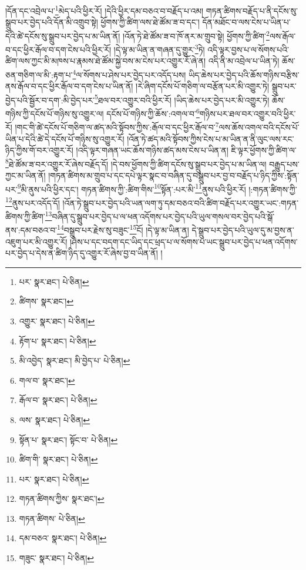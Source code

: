 །དོན་དང་འབྲེལ་པ་\footnote{པར་  སྣར་ཐང་།  པེ་ཅིན། }མེད་པའི་ཕྱིར་རོ། །དེའི་ཕྱིར་དམ་བཅའ་བ་བརྗོད་པ་འམ། གཏན་ཚིགས་བརྗོད་པ་ནི་དངོས་སུ་སྒྲུབ་པར་བྱེད་པའི་དོན་མི་འགྲུབ་སྟེ། ཕྱོགས་ཀྱི་ཚིག་ལས་ཐེ་ཚོམ་ཟ་བ་དང་། དོན་མཐོང་བ་ལས་ངེས་པ་ཡིན་པ་དེའི་ཚེ་དངོས་སུ་སྒྲུབ་པར་བྱེད་པ་མ་ཡིན་ནོ། །འོན་ཏེ་ཐེ་ཚོམ་ཟ་བ་ཁོ་ནར་མ་གྲུབ་སྟེ། ཕྱོགས་ཀྱི་ཚིག་\footnote{ཚིགས་  སྣར་ཐང་། }ལས་རྒོལ་བ་དང་ཕྱིར་རྒོལ་བ་དག་ངེས་པའི་ཕྱིར་རོ། །དེ་ལྟ་མ་ཡིན་ན་གཞན་དུ་གྱུར་\footnote{འགྱུར་  སྣར་ཐང་།  པེ་ཅིན། }ཏེ། འདི་ལྟར་བྱས་པ་ལ་སོགས་པའི་ཚིག་ལས་ཀྱང་མི་མཁས་པ་རྣམས་ཐེ་ཚོམ་སྐྱེ་བས་མ་ངེས་པར་འགྱུར་རོ་ཞེ་ན། འདི་ནི་མ་འབྲེལ་པ་ཡིན་ཏེ། ཆོས་ཅན་གཅིག་ལ་མི་:རྟག་པ་\footnote{རྟོག་པ་  སྣར་ཐང་།  པེ་ཅིན། }ལ་སོགས་པ་ཤེས་པར་བྱེད་པར་འདོད་པས། ཡིད་ཆེས་པར་བྱེད་པའི་ཆོས་གཉིས་བརྩིས་ནས་རྒོལ་བ་དང་ཕྱིར་རྒོལ་བ་དག་ངེས་པ་ཡིན་ནོ། །རེ་ཞིག་དངོས་པོ་གཅིག་ལ་བརྩོན་པར་མི་འགྱུར་ཏེ། སྒྲུབ་པར་བྱེད་པའི་སྦྱོར་བ་དག་:མི་བྱེད་པར་\footnote{མི་འབྱེད་  སྣར་ཐང་། མི་བྱེད་པ་  པེ་ཅིན། }ཐལ་བར་འགྱུར་བའི་ཕྱིར་རོ། །ཡིད་ཆེས་པར་བྱེད་པར་མི་འགྱུར་ཏེ། ཆོས་གཉིས་ཀྱི་དངོས་པོ་གཉིས་སུ་འགྱུར་ལ། དངོས་པོ་གཉིས་ཀྱི་ཆོས་:འགལ་བ་\footnote{གལ་བ་  སྣར་ཐང་། }གཉིས་པར་ཐལ་བར་འགྱུར་བའི་ཕྱིར་རོ། །གང་གི་ཚེ་དངོས་པོ་གཅིག་ལ་ཚད་མའི་སྟོབས་ཀྱིས་:རྒོལ་བ་དང་ཕྱིར་རྒོལ་བ་\footnote{རྒོལ་བ་  སྣར་ཐང་།  པེ་ཅིན། }ལས་ཆོས་འགལ་བའི་དངོས་པོ་ཡིན་པ་དེའི་ཚེ་དེ་དངོས་པོ་གཉིས་སུ་འགྱུར་རོ། །འོན་ཏེ་ཚད་མའི་སྟོབས་ཀྱིས་ངེས་པ་མ་ཡིན་ན་ནི་ལུང་ལས་རང་ཉིད་ཀྱིས་གོ་བར་འགྱུར་རོ། །འདི་ལྟར་གཞན་ཡང་ཆོས་གཉིས་ཚད་མས་ངེས་པ་ཡིན་ན། ཇི་ལྟར་ཕྱོགས་ཀྱི་ཚིག་ལ་\footnote{ལས་  སྣར་ཐང་།  པེ་ཅིན། }ཐེ་ཚོམ་ཟ་བར་འགྱུར་རོ་ཞེས་བརྗོད་དོ། །དེ་བས་ཕྱོགས་ཀྱི་ཚིག་དངོས་སུ་སྒྲུབ་པར་བྱེད་པ་མ་ཡིན་ལ། བརྒྱུད་པས་ཀྱང་མ་ཡིན་ནོ། །གཏན་ཚིགས་མ་གྲུབ་པ་དང་དཔེ་ལྟར་སྣང་བ་བཞིན་དུ་བསྒྲུབ་པར་བྱ་བ་བརྗོད་པ་ཉིད་ཀྱིས་:སྟོན་པར་\footnote{སྟོན་པ་  སྣར་ཐང་། སྟོང་བ་  པེ་ཅིན། }མི་ནུས་པའི་ཕྱིར་དང་། གཏན་ཚིགས་ཀྱི་:ཚིག་གིས་\footnote{ཚིག་གི་  སྣར་ཐང་།  པེ་ཅིན། }སྟོན་:པར་མི་\footnote{པར་  སྣར་ཐང་།  པེ་ཅིན། }ནུས་པའི་ཕྱིར་རོ། །:གཏན་ཚིགས་ཀྱི་\footnote{གཏན་ཚིགས་ཀྱིས་  སྣར་ཐང་། }ནུས་པར་འདོད་དོ། །འོན་ཏེ་སྒྲུབ་པར་བྱེད་པའི་ཡན་ལག་ཏུ་དམ་བཅའ་བའི་ཚིག་བརྗོད་པར་འགྱུར་ཡང་:གཏན་ཚིགས་ཀྱི་ཚིག་\footnote{གཏན་ཚིགས་  པེ་ཅིན། }བཞིན་དུ་སྒྲུབ་པར་བྱེད་པ་ལ་ཕན་འདོགས་པར་བྱེད་པའི་ཡུལ་གསལ་བར་བྱེད་པའི་སྒོ་ནས་:དམ་བཅའ་བ་\footnote{དམ་བཅའ་  སྣར་ཐང་།  པེ་ཅིན། }བསྒྲུབ་པར་རྗེས་སུ་བཟུང་\footnote{གཟུང་  སྣར་ཐང་།  པེ་ཅིན། }ངོ། །དེ་ལྟ་མ་ཡིན་ན། དེ་སྒྲུབ་པར་བྱེད་པའི་ཡུལ་དུ་མ་བྱས་ན་འཇུག་པར་མི་འགྱུར་རོ། །ཤེས་པ་དང་བདག་དང་ཡིད་དང་ཕྲད་པ་ལ་སོགས་པ་ཡང་སྒྲུབ་པར་བྱེད་པ་ཕན་འདོགས་པར་བྱེད་པ་དེས་ན་ཚིག་ཉིད་དུ་འགྱུར་རོ་ཞེས་བྱ་བ་ཡིན་ནོ། །
